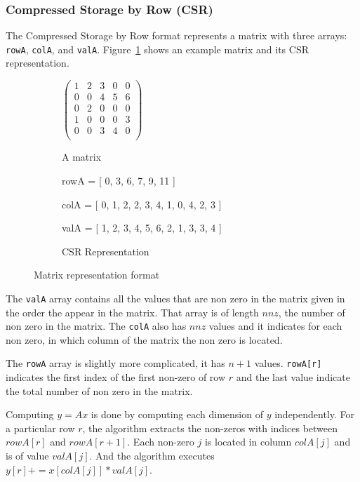 \documentclass[sigconf,review,anonymous]{acmart}
\begin{document}
\subsubsection{Compressed Storage by Row (CSR)}

The Compressed Storage by Row format represents a matrix with three
arrays: \texttt{rowA}, \texttt{colA}, and
\texttt{valA}. Figure~\ref{fig:matrepcsr} shows an example matrix and
its CSR representation.

\begin{figure}
  \begin{subfigure}[b]{.3\linewidth}
    $\begin{pmatrix}
      1 & 2 & 3 & 0 & 0 \\
      0 & 0 & 4 & 5 & 6 \\
      0 & 2 & 0 & 0 & 0 \\
      1 & 0 & 0 & 0 & 3 \\
      0 & 0 & 3 & 4 & 0 \\
    \end{pmatrix}$

    \caption{A matrix}
  \end{subfigure}
  \begin{subfigure}[b]{.6\linewidth}
    rowA = [ 0, 3, 6, 7, 9, 11 ] 
    
    colA = [ 0, 1, 2, 2, 3, 4, 1, 0, 4, 2, 3 ] 
    
    valA = [ 1, 2, 3, 4, 5, 6, 2, 1, 3, 3, 4 ]

    \caption{CSR Representation}
  \end{subfigure}
  
  \caption{Matrix representation format}
  \label{fig:matrepcsr}
\end{figure}

The \texttt{valA} array contains all the values that are non zero in
the matrix given in the order the appear in the matrix. That array is
of length $nnz$, the number of non zero in the matrix. The
\texttt{colA} also has $nnz$ values and it indicates for each non
zero, in which column of the matrix the non zero is located.

The \texttt{rowA} array is slightly more complicated, it has $n+1$
values. \texttt{rowA[r]} indicates the first index of the first
non-zero of row $r$ and the last value indicate the total number of
non zero in the matrix.

Computing $y = A x$ is done by computing each dimension of $y$
independently. For a particular row $r$, the algorithm extracts the
non-zeros with indices between $rowA[r]$ and $rowA[r+1]$. Each
non-zero $j$ is located in column $colA[j]$ and is of value
$valA[j]$. And the algorithm executes $y[r] += x[colA[j]]*valA[j]$.
\end{document}

